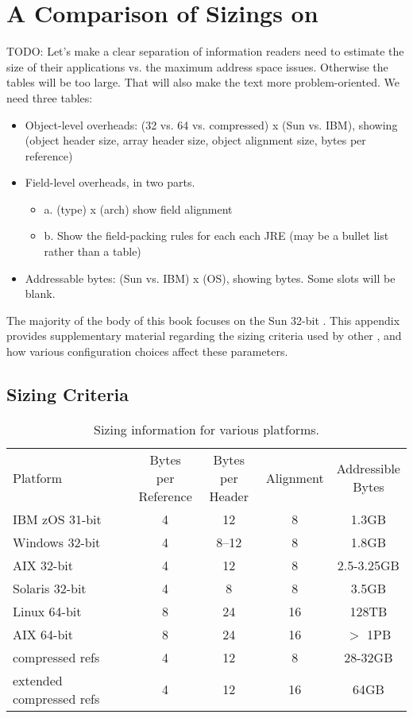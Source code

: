 \chapter{A Comparison of Sizings on \jres}
\label{chapter:jre-comparison}

TODO:  Let's make a clear separation of information readers need to estimate the
size of their applications vs. the maximum address space issues.  Otherwise the
tables will be too large. That will also make the text more
problem-oriented.  We need three tables:
\begin{itemize}
\item Object-level overheads: (32 vs. 64 vs. compressed) x (Sun vs. IBM),
showing (object header size, array header size, object alignment size, bytes per
reference) 
\item Field-level overheads, in two parts.
\begin{itemize}
  \item a. (type) x (arch) show field alignment
  \item b. Show the field-packing rules for each each JRE (may be a bullet list
rather than a table)
\end{itemize}
\item Addressable bytes: (Sun vs. IBM) x (OS), showing bytes.  Some slots will
be blank.
\end{itemize}

The majority of the body of this book focuses on the Sun 32-bit \jre. This
appendix provides supplementary material regarding the sizing criteria used by
other \jres, and how various configuration choices affect these parameters.

\section{Sizing Criteria}


\begin{table}
\centering
\begin{tabular}{lcccc}
\toprule
Platform & \shortstack{Bytes per\\Reference} & \shortstack{Bytes per\\Header} & Alignment & \shortstack{Addressible\\Bytes} \\
\cmidrule(r){1-1} \cmidrule(r){2-5}
IBM zOS 31-bit &  4 & 12    & 8 & 1.3GB \\ 
Windows 32-bit &  4 & 8--12 & 8 & 1.8GB \\
AIX 32-bit     &  4 & 12    & 8 & 2.5-3.25GB\\ 
Solaris 32-bit &  4 & 8     & 8 & 3.5GB \\ 
\cmidrule(r){1-1} \cmidrule(r){2-5}
Linux 64-bit   &  8 & 24    & 16 & 128TB \\
AIX 64-bit     &  8 & 24    & 16 & $>$ 1PB \\
compressed refs & 4 & 12 & 8 & 28-32GB \\
extended compressed refs & 4 & 12 & 16 & 64GB \\
\bottomrule
\end{tabular}
\caption{Sizing information for various platforms.}
\label{tab:sizing-criteria}
\end{table}

